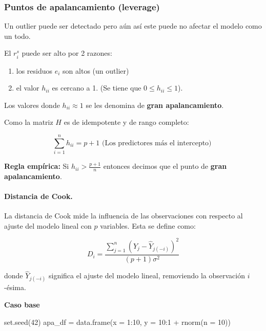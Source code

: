 \documentclass[
  12pt,
]{book}
\newenvironment{Shaded}{\begin{snugshade}}{\end{snugshade}}
\newcommand{\AttributeTok}[1]{\textcolor[rgb]{0.77,0.63,0.00}{#1}}
\newcommand{\DecValTok}[1]{\textcolor[rgb]{0.00,0.00,0.81}{#1}}
\newcommand{\FunctionTok}[1]{\textcolor[rgb]{0.00,0.00,0.00}{#1}}
\newcommand{\NormalTok}[1]{#1}
\newcommand{\OtherTok}[1]{\textcolor[rgb]{0.56,0.35,0.01}{#1}}
\newcommand{\SpecialCharTok}[1]{\textcolor[rgb]{0.00,0.00,0.00}{#1}}
\providecommand{\tightlist}{%
  \setlength{\itemsep}{0pt}\setlength{\parskip}{0pt}}
\begin{document}
\hypertarget{puntos-de-apalancamiento-leverage}{%
\subsubsection{Puntos de apalancamiento
(leverage)}\label{puntos-de-apalancamiento-leverage}}

Un outlier puede ser detectado pero aún así este puede no afectar el
modelo como un todo.

El \(r_{i}^s\) puede ser alto por 2 razones:

\begin{enumerate}
\def\labelenumi{\arabic{enumi}.}
\tightlist
\item
  los residuos \(e_i\) son altos (un outlier)
\item
  el valor \(h_{ii}\) es cercano a 1. (Se tiene que
  \(0\leq h_{ii}\leq 1\)).
\end{enumerate}

Los valores donde \(h_{ii}\approx 1\) se les denomina de \textbf{gran
apalancamiento}.

Como la matriz \(H\) es de idempotente y de rango completo:

\begin{equation*}
\sum_{i=1}^{n} h_{ii} = p +1 \text{  (Los predictores más el intercepto)   }
\end{equation*}

\textbf{Regla empírica:} Si \(h_{ii}>\frac{p+1}{n}\) entonces decimos
que el punto de \textbf{gran apalancamiento}.

\hypertarget{distancia-de-cook.}{%
\paragraph{Distancia de Cook.}\label{distancia-de-cook.}}

La distancia de Cook mide la influencia de las observaciones con
respecto al ajuste del modelo lineal con \(p\) variables. Esta se define
como:

\[
\displaystyle D_i = \frac{\sum\limits_{j=1}^n (\hat{Y}_j - \hat{Y}_{j(-i)})^2}{(p+1) \sigma^2}
\]

donde \(\hat{Y}_{j(-i)}\) significa el ajuste del modelo lineal,
removiendo la observación \(i\)-ésima.

\textbf{Caso base}

\begin{Shaded}
\begin{Highlighting}[]
\FunctionTok{set.seed}\NormalTok{(}\DecValTok{42}\NormalTok{)}
\NormalTok{apa\_df }\OtherTok{=} \FunctionTok{data.frame}\NormalTok{(}\AttributeTok{x =} \DecValTok{1}\SpecialCharTok{:}\DecValTok{10}\NormalTok{, }\AttributeTok{y =} \DecValTok{10}\SpecialCharTok{:}\DecValTok{1} \SpecialCharTok{+} \FunctionTok{rnorm}\NormalTok{(}\AttributeTok{n =} \DecValTok{10}\NormalTok{))}
\end{Highlighting}
\end{Shaded}
\end{document}
